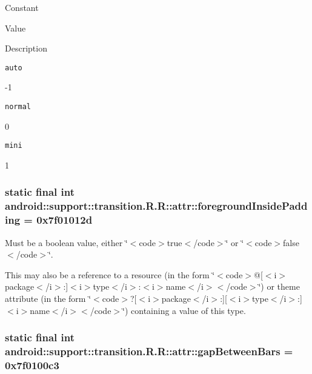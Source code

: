 Constant

Value

Description 

{\tt auto}

-1

{\tt normal}

0

{\tt mini}

1\hypertarget{classandroid_1_1support_1_1transition_1_1_r_1_1attr_b4196f250dae90b0b447a82aec17ebf2}{
\subsubsection[{foregroundInsidePadding}]{\setlength{\rightskip}{0pt plus 5cm}static final int android::support::transition.R.R::attr::foregroundInsidePadding = 0x7f01012d}}
\label{classandroid_1_1support_1_1transition_1_1_r_1_1attr_b4196f250dae90b0b447a82aec17ebf2}


Must be a boolean value, either \char`\"{}$<$code$>$true$<$/code$>$\char`\"{} or \char`\"{}$<$code$>$false$<$/code$>$\char`\"{}. 

This may also be a reference to a resource (in the form \char`\"{}$<$code$>$@\mbox{[}$<$i$>$package$<$/i$>$:\mbox{]}$<$i$>$type$<$/i$>$:$<$i$>$name$<$/i$>$$<$/code$>$\char`\"{}) or theme attribute (in the form \char`\"{}$<$code$>$?\mbox{[}$<$i$>$package$<$/i$>$:\mbox{]}\mbox{[}$<$i$>$type$<$/i$>$:\mbox{]}$<$i$>$name$<$/i$>$$<$/code$>$\char`\"{}) containing a value of this type. \hypertarget{classandroid_1_1support_1_1transition_1_1_r_1_1attr_6f1c2de31f67baa9d9bce4ed5994e993}{
\subsubsection[{gapBetweenBars}]{\setlength{\rightskip}{0pt plus 5cm}static final int android::support::transition.R.R::attr::gapBetweenBars = 0x7f0100c3}}
\label{classandroid_1_1support_1_1transition_1_1_r_1_1attr_6f1c2de31f67baa9d9bce4ed5994e993}


